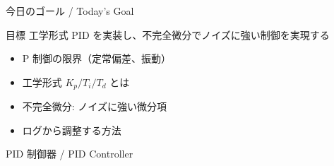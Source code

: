 \documentclass[aspectratio=169, 14pt]{beamer}
\begin{document}
\begin{frame}
  \titlepage
\end{frame}

\begin{frame}{今日のゴール / Today's Goal}
  \begin{block}{目標}
    工学形式 PID を実装し、不完全微分でノイズに強い制御を実現する
  \end{block}

  \vspace{0.8em}

  \begin{itemize}
    \item P 制御の限界（定常偏差、振動）
    \item 工学形式 $K_p / T_i / T_d$ とは
    \item 不完全微分: ノイズに強い微分項
    \item ログから調整する方法
  \end{itemize}
\end{frame}

\begin{frame}{PID 制御器 / PID Controller}
  \begin{center}
    \resizebox{0.78\textwidth}{!}{}
  \end{center}
\end{frame}
\end{document}
